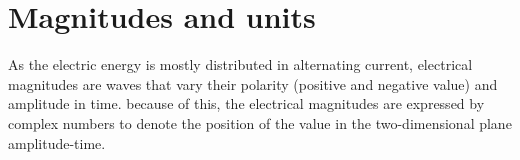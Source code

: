 \documentclass[nols,a4paper,twoside,symmetric,notoc,fleqn]{tufte-book}
\begin{document}
%
%
%
%
%

\chapter{Magnitudes and units}

As the electric energy is mostly distributed in alternating current, electrical magnitudes are waves that vary their polarity (positive and negative value) and amplitude in time. because of this, the electrical magnitudes are expressed by complex numbers to denote the position of the value in the two-dimensional plane amplitude-time. 
\end{document}
